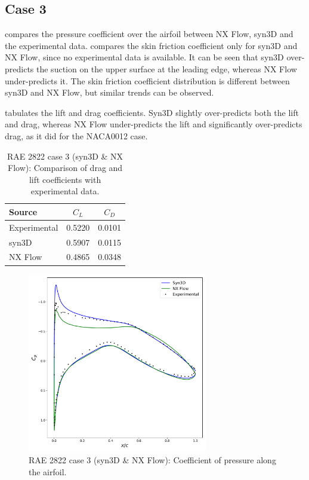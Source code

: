 \subsection{Case 3}
%
%
 compares the pressure coefficient over the airfoil between NX Flow, syn3D and the experimental data.  compares the skin friction coefficient only for syn3D and NX Flow, since no experimental data is available. It can be seen that syn3D over-predicts the suction on the upper surface at the leading edge, whereas NX Flow under-predicts it. The skin friction coefficient distribution is different between syn3D and NX Flow, but similar trends can be observed.

 tabulates the lift and drag coefficients. Syn3D slightly over-predicts both the lift and drag, whereas NX Flow under-predicts the lift and significantly over-predicts drag, as it did for the NACA0012 case. 
\begin{table}
    \centering
    \caption{RAE 2822 case 3 (syn3D \& NX Flow): Comparison of drag and lift coefficients with experimental data.}
    \label{tab:raecase3}
    \begin{tabular}{@{}lcc@{}}
        \toprule
        Source & $C_L$ & $C_D$ \\
        \midrule
        Experimental & 0.5220 & 0.0101 \\
        syn3D & 0.5907 & 0.0115 \\ 
        NX Flow & 0.4865 & 0.0348 \\
         \bottomrule
    \end{tabular}
\end{table}
\begin{figure}
    \centering
    \includegraphics[width=0.7\textwidth]{figs/rae/cp_case3}
    \caption{RAE 2822 case 3 (syn3D \& NX Flow): Coefficient of pressure along the airfoil.}
    \label{fig:raecp3}
\end{figure}
